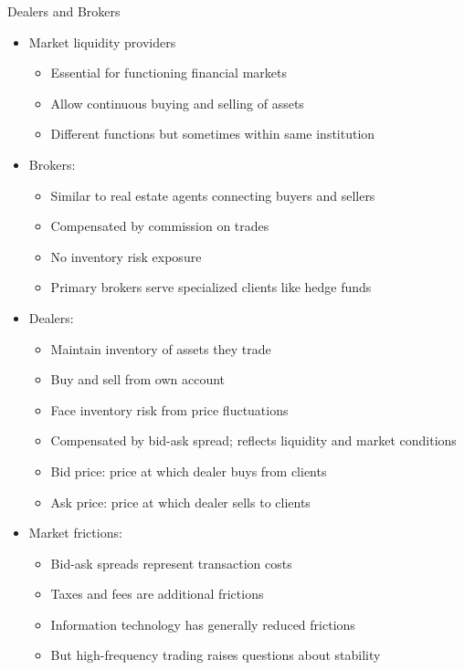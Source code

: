 \documentclass[10pt]{beamer}
\begin{document}
\begin{frame}{Dealers and Brokers}
  \begin{itemize}[<+->]
    \item Market liquidity providers
      \begin{itemize}
        \item Essential for functioning financial markets
        \item Allow continuous buying and selling of assets
        \item Different functions but sometimes within same institution
      \end{itemize}
    \item Brokers:
      \begin{itemize}
        \item Similar to real estate agents connecting buyers and sellers
        \item Compensated by commission on trades
        \item No inventory risk exposure
        \item Primary brokers serve specialized clients like hedge funds
      \end{itemize}
    \item Dealers:
      \begin{itemize}
        \item Maintain inventory of assets they trade
        \item Buy and sell from own account
        \item Face inventory risk from price fluctuations
        \item Compensated by bid-ask spread; reflects liquidity and market conditions
        \item Bid price: price at which dealer buys from clients
        \item Ask price: price at which dealer sells to clients
      \end{itemize}
    \item Market frictions:
      \begin{itemize}
        \item Bid-ask spreads represent transaction costs
        \item Taxes and fees are additional frictions
        \item Information technology has generally reduced frictions
        \item But high-frequency trading raises questions about stability
      \end{itemize}
  \end{itemize}
\end{frame}
\end{document}
